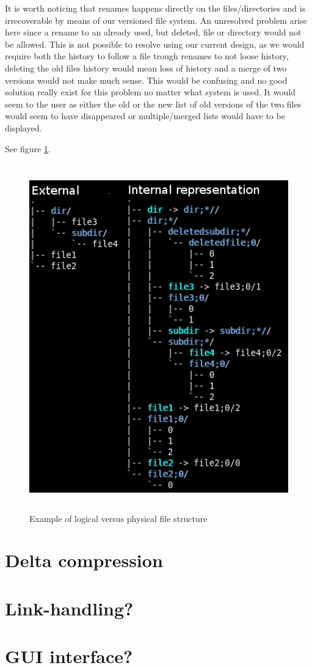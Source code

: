 \documentclass[12pt]{article}
\begin{document}
It is worth noticing that renames happens directly on the
files/directories and is irrecoverable by means of our versioned file
system. An unresolved problem arise here since a rename to an already
used, but deleted, file or directory would not be allowed. This is not
possible to resolve using our current design, as we would require both
the history to follow a file trough renames to not loose history,
deleting the old files history would mean loss of history and a merge
of two versions would not make much sense. This would be confusing and
no good solution really exist for this problem no matter what system
is used. It would seem to the user as either the old or the new list
of old versions of the two files would seem to have disappeared or
multiple/merged lists would have to be displayed.

See figure \ref{structurefig}.

\begin{figure}
\begin{center}
\includegraphics[height=150mm]{filestructure.png}
\end{center}
\caption{Example of logical versus physical file structure}
\label{structurefig}
\end{figure}

\section{Delta compression}

\section{Link-handling?}

\section{GUI interface?}




 
\end{document}
